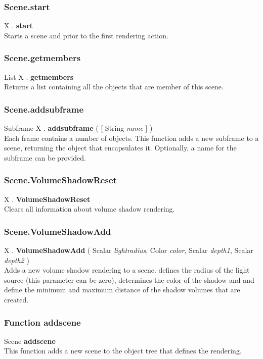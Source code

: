 \subsubsection{Scene.start \label{F:Scene:start}}
X . \textbf{start} \\
Starts a scene and prior to the first rendering action.

\subsubsection{Scene.getmembers \label{F:Scene:getmembers}}
List X . \textbf{getmembers} \\
Returns a list containing all the  objects that are member of this scene.

\subsubsection{Scene.addsubframe \label{F:Scene:addsubframe}}
Subframe X . \textbf{addsubframe} (  [ String \textit{name} ] ) \\
Each frame contains a number of  objects. This function adds a new subframe to a scene, returning the object that encapsulates it. Optionally, a name for the subframe can be provided.

\subsubsection{Scene.VolumeShadowReset \label{F:Scene:VolumeShadowReset}}
X . \textbf{VolumeShadowReset} \\
Clears all information about volume shadow rendering.

\subsubsection{Scene.VolumeShadowAdd \label{F:Scene:VolumeShadowAdd}}
X . \textbf{VolumeShadowAdd} ( Scalar \textit{lightradius}, Color \textit{color}, Scalar \textit{depth1}, Scalar \textit{depth2} ) \\
Adds a new volume shadow rendering to a scene.  defines the radius of the light source (this parameter can  be zero),  determines the color of the shadow and  and  define the minimum and maximum distance of the shadow volumes that are created.

\subsubsection{Function addscene \label{F:addscene}}
Scene \textbf{addscene} \\
This function adds a new scene to the object tree that defines the rendering.

